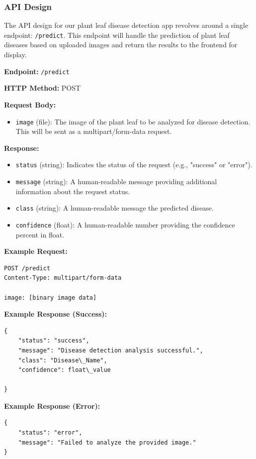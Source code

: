 \documentclass{article}
\begin{document}
\subsubsection{API Design}

The API design for our plant leaf disease detection app revolves around a single endpoint: \texttt{/predict}. This endpoint will handle the prediction of plant leaf diseases based on uploaded images and return the results to the frontend for display.

\textbf{Endpoint:} \texttt{/predict}

\textbf{HTTP Method:} POST

\textbf{Request Body:}
\begin{itemize}
    \item \texttt{image} (file): The image of the plant leaf to be analyzed for disease detection. This will be sent as a multipart/form-data request.
\end{itemize}

\textbf{Response:}
\begin{itemize}
    \item \texttt{status} (string): Indicates the status of the request (e.g., "success" or "error").
    \item \texttt{message} (string): A human-readable message providing additional information about the request status.
    \item \texttt{class} (string): A human-readable message the predicted disease.
    \item \texttt{confidence} (float): A human-readable number providing the confidence percent in float.
\end{itemize}

\textbf{Example Request:}
\begin{verbatim}
POST /predict
Content-Type: multipart/form-data

image: [binary image data]
\end{verbatim}

\textbf{Example Response (Success):}
\begin{verbatim}
{
    "status": "success",
    "message": "Disease detection analysis successful.",
    "class": "Disease\_Name",
    "confidence": float\_value
    
}
\end{verbatim}

\textbf{Example Response (Error):}
\begin{verbatim}
{
    "status": "error",
    "message": "Failed to analyze the provided image."
}
\end{verbatim}
\end{document}
